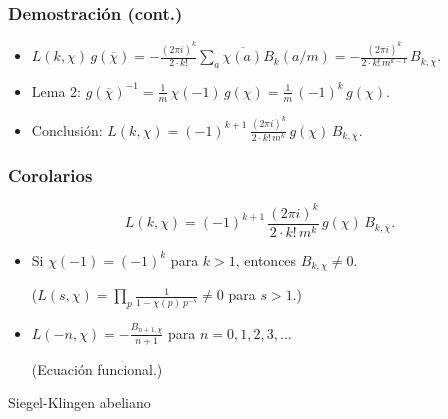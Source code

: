 \documentclass[handout]{beamer}
\begin{document}

\begin{frame}
  \frametitle{Demostración (cont.)}

  \begin{itemize}
  \item<1->
    $L (k,\chi)\,g (\overline{\chi}) = -\frac{(2\pi i)^k}{2\cdot k!} \sum_a \overline{\chi (a)} B_k (a/m) = -\frac{(2\pi i)^k}{2\cdot k!\,m^{k-1}}\,B_{k,\overline{\chi}}$.

    \item<2-> Lema 2: $g (\overline{\chi})^{-1} = \frac{1}{m}\,\chi (-1)\,g (\chi) = \frac{1}{m}\,(-1)^k\,g (\chi)$.

    \item<3-> Conclusión:
      $L (k,\chi) = (-1)^{k+1}\,\frac{(2\pi i)^k}{2\cdot k!\,m^k}\,g (\chi)\,B_{k,\overline{\chi}}$.
  \end{itemize}
\end{frame}


\begin{frame}
  \frametitle{Corolarios}

  \[ L (k,\chi) = (-1)^{k+1}\,\frac{(2\pi i)^k}{2\cdot k!\,m^k}\,g (\chi)\,B_{k,\overline{\chi}}. \]

  \begin{itemize}
  \item<2-> Si $\chi (-1) = (-1)^k$ para $k > 1$, entonces $B_{k,\chi} \ne 0$.

    ($L (s,\chi) = \prod_p \frac{1}{1 - \chi (p)\,p^{-s}} \ne 0$ para $s > 1$.)

  \item<3-> $L (-n,\chi) = -\frac{B_{n+1,\chi}}{n+1}$ para $n = 0,1,2,3,\ldots$

    (Ecuación funcional.)
  \end{itemize}
\end{frame}


\begin{frame}[plain]
  \headingfont

  \begin{center}
    {\huge Siegel-Klingen abeliano}
  \end{center}
\end{frame}
\end{document}
